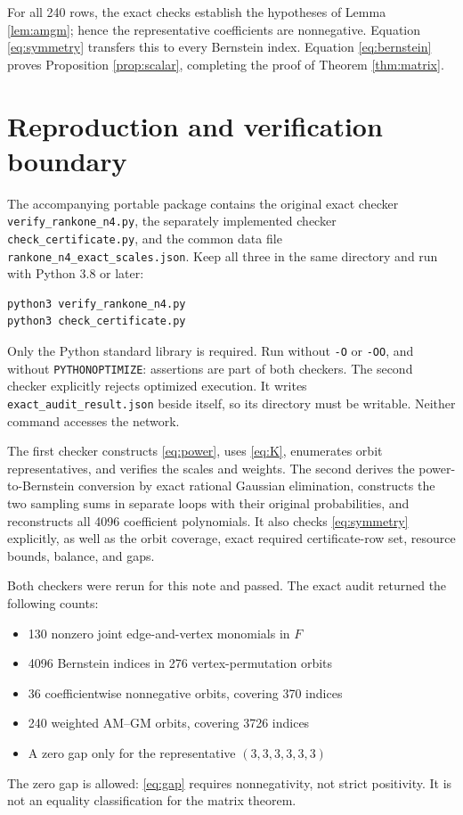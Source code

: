 \documentclass[11pt,letterpaper]{article}
\begin{document}
For all 240 rows, the exact checks establish the hypotheses of Lemma \ref{lem:amgm}; hence the representative coefficients are nonnegative. Equation \eqref{eq:symmetry} transfers this to every Bernstein index. Equation \eqref{eq:bernstein} proves Proposition \ref{prop:scalar}, completing the proof of Theorem \ref{thm:matrix}.

\section{Reproduction and verification boundary}
The accompanying portable package contains the original exact checker \nolinkurl{verify_rankone_n4.py}, the separately implemented checker \nolinkurl{check_certificate.py}, and the common data file \nolinkurl{rankone_n4_exact_scales.json}. Keep all three in the same directory and run with Python 3.8 or later:
\begin{Verbatim}[fontsize=\small]
python3 verify_rankone_n4.py
python3 check_certificate.py
\end{Verbatim}
Only the Python standard library is required. Run without \texttt{-O} or \texttt{-OO}, and without \texttt{PYTHONOPTIMIZE}: assertions are part of both checkers. The second checker explicitly rejects optimized execution. It writes \nolinkurl{exact_audit_result.json} beside itself, so its directory must be writable. Neither command accesses the network.

The first checker constructs \eqref{eq:power}, uses \eqref{eq:K}, enumerates orbit representatives, and verifies the scales and weights. The second derives the power-to-Bernstein conversion by exact rational Gaussian elimination, constructs the two sampling sums in separate loops with their original probabilities, and reconstructs all 4096 coefficient polynomials. It also checks \eqref{eq:symmetry} explicitly, as well as the orbit coverage, exact required certificate-row set, resource bounds, balance, and gaps.

Both checkers were rerun for this note and passed. The exact audit returned the following counts:
\begin{itemize}
\item 130 nonzero joint edge-and-vertex monomials in $F$
\item 4096 Bernstein indices in 276 vertex-permutation orbits
\item 36 coefficientwise nonnegative orbits, covering 370 indices
\item 240 weighted AM--GM orbits, covering 3726 indices
\item A zero gap only for the representative $(3,3,3,3,3,3)$
\end{itemize}
The zero gap is allowed: \eqref{eq:gap} requires nonnegativity, not strict positivity. It is not an equality classification for the matrix theorem.
\end{document}
